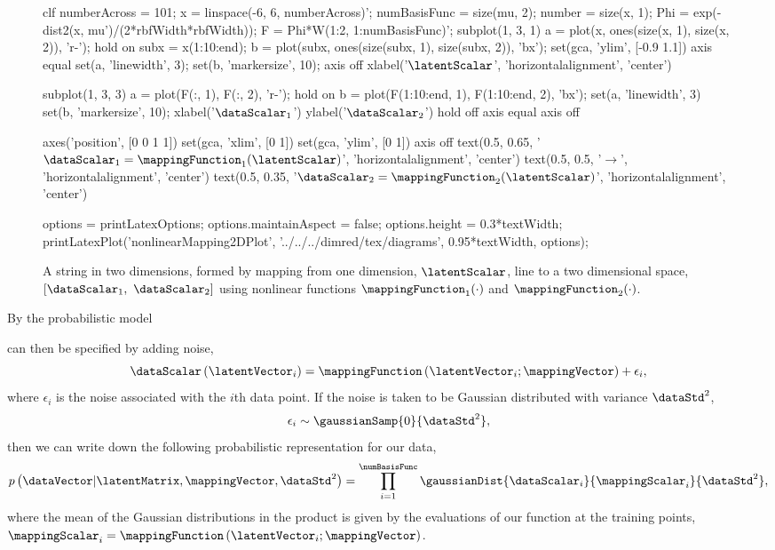 \begin{figure}
  \begin{matlab}
    clf
    numberAcross = 101;
    x = linspace(-6, 6, numberAcross)';
    numBasisFunc = size(mu, 2);
    number = size(x, 1);
    Phi = exp(-dist2(x, mu')/(2*rbfWidth*rbfWidth));
    F = Phi*W(1:2, 1:numBasisFunc)';
    subplot(1, 3, 1)
    a = plot(x, ones(size(x, 1), size(x, 2)), 'r-');
    hold on
    subx = x(1:10:end);
    b = plot(subx, ones(size(subx, 1), size(subx, 2)), 'bx');
    set(gca, 'ylim', [-0.9 1.1])
    axis equal
    set(a, 'linewidth', 3);
    set(b, 'markersize', 10);
    axis off
    xlabel('$\latentScalar$', 'horizontalalignment', 'center')

    
    subplot(1, 3, 3)
    a = plot(F(:, 1), F(:, 2), 'r-');
    hold on
    b = plot(F(1:10:end, 1), F(1:10:end, 2), 'bx');
    set(a, 'linewidth', 3)
    set(b, 'markersize', 10);
    xlabel('$\dataScalar_1$')
    ylabel('$\dataScalar_2$')
    hold off
    axis equal
    axis off

    axes('position', [0 0 1 1])
    set(gca, 'xlim', [0 1])
    set(gca, 'ylim', [0 1])
    axis off
    text(0.5, 0.65, '\large$\dataScalar_1 = \mappingFunction_1(\latentScalar)$', 'horizontalalignment', 'center')
    text(0.5, 0.5, '\LARGE$\longrightarrow$', 'horizontalalignment', 'center')
    text(0.5, 0.35, '\large$\dataScalar_2 = \mappingFunction_2(\latentScalar)$', 'horizontalalignment', 'center')


    options = printLatexOptions;
    options.maintainAspect = false;
    options.height = 0.3*textWidth;
    printLatexPlot('nonlinearMapping2DPlot', '../../../dimred/tex/diagrams', 0.95*textWidth, options);

  \end{matlab}
  \begin{center}
    
  \end{center}
  \caption{A string in two dimensions, formed by mapping from one
    dimension, $\latentScalar$, line to a two dimensional space,
    $[\dataScalar_1,\ \dataScalar_2]$ using nonlinear functions
    $\mappingFunction_1(\cdot)$ and
    $\mappingFunction_2(\cdot)$.}
  \label{fig:sampleManifold2d}
\end{figure}

By the probabilistic model 


can then be specified by adding noise,
\[
\dataScalar\left(\latentVector_i\right) = \mappingFunction\left(\latentVector_i; \mappingVector\right) +
\epsilon_i,
\]
where $\epsilon_i$ is the noise associated with the $i$th data
point. If the noise is taken to be Gaussian distributed with variance
$\dataStd^2$,
\[
\epsilon_i\sim\gaussianSamp{0}{\dataStd^2},
\]
then we can write down the following probabilistic representation for
our data,
\[
p\left(\dataVector|\latentMatrix, \mappingVector, \dataStd^2\right) =
\prod_{i=1}^\numBasisFunc\gaussianDist{\dataScalar_i}{\mappingScalar_i}{\dataStd^2},
\]
where the mean of the Gaussian distributions in the product is given
by the evaluations of our function at the training points,
$\mappingScalar_i=\mappingFunction\left(\latentVector_i; \mappingVector\right)$.

